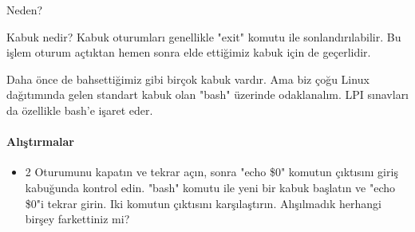 \documentclass[10pt,a5paper]{book}
\begin{document}
\begin{section}{Neden?}
\begin{subsection}{Kabuk nedir?}
Kabuk oturumları genellikle "exit" komutu ile sonlandırılabilir. Bu işlem oturum açtıktan hemen sonra elde ettiğimiz kabuk için de geçerlidir.

Daha önce de bahsettiğimiz gibi birçok kabuk vardır. Ama biz çoğu Linux dağıtımında gelen standart kabuk olan "bash" üzerinde odaklanalım. LPI sınavları da özellikle bash'e işaret eder.
\paragraph{Alıştırmalar}{
\begin{itemize}
 \item 2 Oturumunu kapatın ve tekrar açın, sonra "echo \$0" komutun çıktısını giriş kabuğunda kontrol edin. "bash" komutu ile yeni bir kabuk başlatın ve "echo \$0"i tekrar girin. Iki komutun çıktısını karşılaştırın. Alışılmadık herhangi birşey farkettiniz mi?
\end{itemize}}
\end{subsection}
\end{section}
\end{document}
